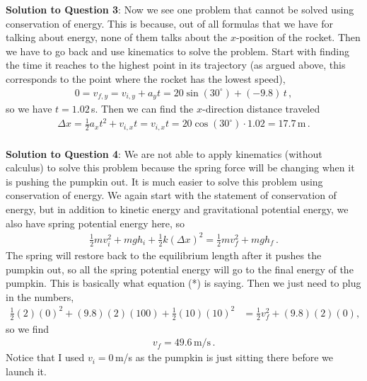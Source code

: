 \documentclass[11pt]{article}
\begin{document}
\textbf{Solution to Question 3}: Now we see one problem that cannot be solved using conservation of energy. This is because, out of all formulas that we have for talking about energy, none of them talks about the $x$-position of the rocket. Then we have to go back and use kinematics to solve the problem. Start with finding the time it reaches to the highest point in its trajectory (as argued above, this corresponds to the point where the rocket has the lowest speed), 
\begin{align*}
0 = v_{f,y} = v_{i,y} + a_y t =   20 \sin(30^\circ)+(-9.8)\, t\,,
\end{align*} 
so we have $t = 1.02\,$s. Then we can find the $x$-direction distance traveled
\begin{align*}
\Delta x =\frac{1}{2}a_x t^2 +  v_{i,x}t =  v_{i,x}t = 20 \cos(30^\circ) \cdot 1.02 = 17.7\,\text{m}\,.\\
\end{align*}

\textbf{Solution to Question 4}: We are not able to apply kinematics (without calculus) to solve this problem because the spring force will be changing when it is pushing the pumpkin out. It is much easier to solve this problem using conservation of energy. We again start with the statement of conservation of energy, but in addition to kinetic energy and gravitational potential energy, we also have spring potential energy here, so
\begin{align*}
\frac{1}{2}mv_i^2 + mgh_i + \frac{1}{2}k(\Delta x)^2 = \frac{1}{2}mv_f^2 + mgh_f\,. \tag{*}
\end{align*}
The spring will restore back to the equilibrium length after it pushes the pumpkin out, so all the spring potential energy will go to the final energy of the pumpkin. This is basically what equation (*) is saying. Then we just need to plug in the numbers,
\begin{align*}
\frac{1}{2}(2)(0)^2 + (9.8)(2)(100)+ \frac{1}{2}(10)(10)^2 &= \frac{1}{2}v_f^2 + (9.8)(2)(0),
\end{align*}
so we find
\begin{align*}
v_f = 49.6\,\text{m/s}\,.
\end{align*}
Notice that I used $v_i=0\,$m/s as the pumpkin is just sitting there before we launch it. 
\end{document}
